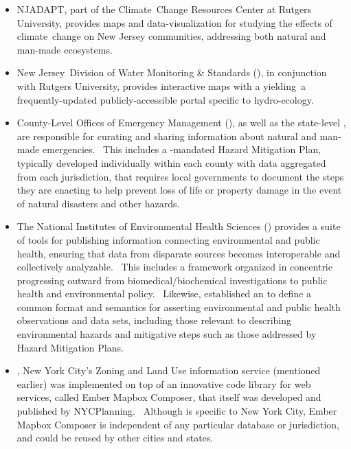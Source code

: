 \documentclass[10.5pt]{article}
\begin{document}
{{\begin{itemize}
\item{} NJADAPT, part of the Climate Change Resources Center at Rutgers University, provides maps and data-visualization for studying the effects of climate change on New Jersey communities, addressing both natural and man-made ecosystems.

\item{} New Jersey Division of Water Monitoring \& Standards (\DWMS{}), in conjunction with Rutgers University, provides interactive maps with a  yielding a frequently-updated publicly-accessible portal specific to hydro-ecology.
  
\item{} County-Level Offices of Emergency Management (\OEM{}), as well as the state-level \OEM{}, are responsible for curating and sharing information about natural and man-made emergencies.  This includes a \FEMA{}-mandated Hazard Mitigation Plan, typically developed individually within each county with data aggregated from each jurisdiction, that requires local governments to document the steps they are enacting to help prevent loss of life or property damage in the event of natural disasters and other hazards.

\item{} The National Institutes of Environmental Health Sciences (\NIEHS{}) provides a suite of tools for publishing information connecting environmental and public health, ensuring that data from disparate sources becomes interoperable and collectively analyzable.  This includes a  framework organized in concentric  progressing outward from biomedical/biochemical investigations to public health and environmental policy.  Likewise, \NIEHS{} established an  to define a common format and semantics for asserting environmental and public health observations and data sets, including those relevant to describing environmental hazards and mitigative steps such as those addressed by Hazard Mitigation Plans. 

\item{} \ZoLa{}, New York City's Zoning and Land Use information service (mentioned earlier) was implemented on top of an innovative code library for \GIS{} web services, called Ember Mapbox Composer, that itself was developed and published by NYCPlanning.  Although \ZoLa{} is specific to New York City, Ember Mapbox Composer is independent of any particular database or jurisdiction, and could be reused by other cities and states.


\end{itemize}}}
\end{document}
